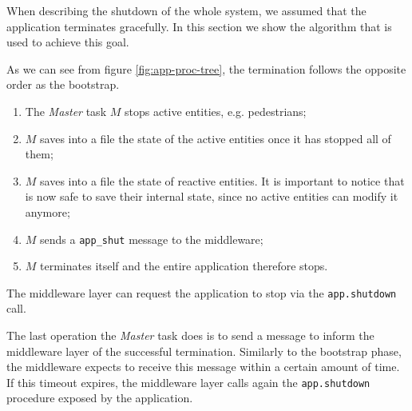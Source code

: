 When describing the shutdown of the whole system, we assumed that the
application terminates gracefully.
In this section we show the algorithm that is used to achieve this goal.

As we can see from figure \ref{fig:app-proc-tree}, the termination follows the
opposite order as the bootstrap.

\begin{enumerate}
  \item The \textit{Master} task $M$ stops active entities, e.g. pedestrians;
  \item $M$ saves into a file the state of the active entities once it has
    stopped all of them;
  \item $M$ saves into a file the state of reactive entities. It is important to
    notice that is now safe to save their internal state, since no active
    entities can modify it anymore;
  \item $M$ sends a \texttt{app\_shut} message to the middleware;
  \item $M$ terminates itself and the entire application therefore stops.
\end{enumerate}

The middleware layer can request the application to stop via the
\texttt{app.shutdown} call.

The last operation the \textit{Master} task does is to send a message to inform
the middleware layer of the successful termination.
Similarly to the bootstrap phase, the middleware expects to receive this
message within a certain amount of time. If this timeout expires, the
middleware layer calls again the \texttt{app.shutdown} procedure exposed by the
application.
